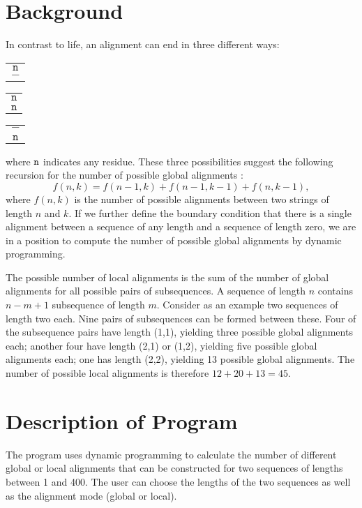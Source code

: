 \section{Background}
In contrast to life, an alignment can end in three different ways:
\begin{enumerate}
  \I \begin{tabular}{c}$\mathtt{n}$\\$\mathtt{-}$\end{tabular}
  \I \begin{tabular}{c}$\mathtt{n}$\\$\mathtt{n}$\end{tabular}
  \I \begin{tabular}{c}$\mathtt{-}$\\$\mathtt{n}$\end{tabular}
\end{enumerate}

where $\tt n$ indicates any residue. These three possibilities suggest
the following recursion for the number of possible global alignments
\cite{wat95:int}:
\[
f(n,k) = f(n-1,k)+f(n-1,k-1)+f(n,k-1),
\]
where $f(n,k)$ is the number of possible alignments between two
strings of length $n$ and $k$. If we further define the boundary
condition that there is a single alignment between a sequence of any
length and a sequence of length zero, we are in a position to compute
the number of possible global alignments by dynamic programming.

The possible number of local alignments is the sum of the number of global
alignments for all possible pairs of subsequences. A sequence of
length $n$ contains $n-m+1$ subsequence of length $m$. Consider as an
example two sequences of length two each. Nine pairs of subsequences
can be formed between these. Four of the subsequence pairs have length (1,1), yielding three possible global
alignments each; another four have length (2,1) or (1,2), yielding
five possible global alignments each; one has length (2,2), yielding
13 possible global alignments. The number of possible local alignments
is therefore $12 + 20 + 13 = 45$.

\section{Description of Program}
The program uses dynamic programming to calculate the number of
different global or local alignments that
can be constructed for two sequences of lengths between 1 and 400. The
user can choose the lengths of the two sequences as well as the
alignment mode (global or local).

